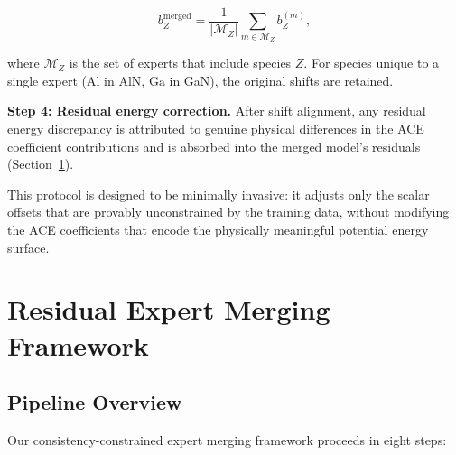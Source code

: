 \documentclass[twoside,prb,aps,floatfix,superscriptaddress,longbibliography]{revtex4-2}
\begin{document}
\begin{equation}
b_Z^{\mathrm{merged}} = \frac{1}{|\mathcal{M}_Z|} \sum_{m \in \mathcal{M}_Z} b_Z^{(m)},
\label{eq:shift_reconciliation}
\end{equation}

where $\mathcal{M}_Z$ is the set of experts that include species $Z$. For species unique to a single expert ($\mathrm{Al}$ in AlN, $\mathrm{Ga}$ in GaN), the original shifts are retained.

\textbf{Step 4: Residual energy correction.} After shift alignment, any residual energy discrepancy is attributed to genuine physical differences in the ACE coefficient contributions and is absorbed into the merged model's residuals (Section~\ref{sec:residual}).

This protocol is designed to be minimally invasive: it adjusts only the scalar offsets that are provably unconstrained by the training data, without modifying the ACE coefficients that encode the physically meaningful potential energy surface.

\section{Residual Expert Merging Framework}
\label{sec:residual}

\subsection{Pipeline Overview}

Our consistency-constrained expert merging framework proceeds in eight steps:
\end{document}
